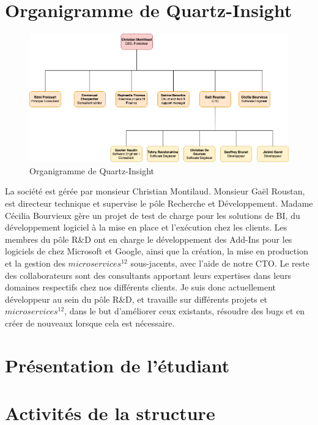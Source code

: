 \documentclass[a4paper, 11pt]{report}
\begin{document}
\section{Organigramme de Quartz-Insight}
\begin{figure}[h]
    \centering
    \includegraphics[scale=0.50,center]{schemas/organigramme-quartz-insight.png}
    \caption{Organigramme de Quartz-Insight}
\end{figure}
La société est gérée par monsieur Christian Montilaud.
Monsieur Gaël Roustan, est directeur technique et supervise le pôle Recherche et Développe\-ment.
Madame Cécilia Bourvieux gère un projet de test de charge pour les solutions de BI, du développement logiciel à la mise en place et l’exécution chez les clients.
Les membres du pôle R\&D ont en charge le développement des Add-Ins pour les logiciels de chez Microsoft et Google, ainsi que la création, la mise en production et la gestion des $microservices^{12}$ sous-jacents, avec l’aide de notre CTO.
Le reste des collaborateurs sont des consultants apportant leurs expertises dans leurs domaines respectifs chez nos différents clients.
\newline
\newline
Je suis donc actuellement développeur au sein du pôle R\&D, et travaille sur différents projets et $microservices^{12}$, dans le but d’améliorer ceux existants, résoudre des bugs et en créer de nouveaux lorsque cela est nécessaire.
\section{Présentation de l'étudiant}


\section{Activités de la structure}
\end{document}
